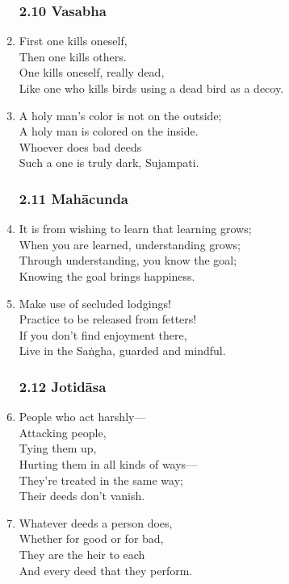 \documentclass[10pt, openany]{book}
\begin{document}
\begin{enumerate}
\subsubsection*{2.10 Vasabha}

\item First one kills oneself,\\
Then one kills others.\\
One kills oneself, really dead,\\
Like one who kills birds using a dead bird as a decoy.

\item A holy man’s color is not on the outside;\\
A holy man is colored on the inside.\\
Whoever does bad deeds\\
Such a one is truly dark, Sujampati.

\subsubsection*{2.11 Mahācunda}

\item It is from wishing to learn that learning grows;\\
When you are learned, understanding grows;\\
Through understanding, you know the goal;\\
Knowing the goal brings happiness.

\item Make use of secluded lodgings!\\
Practice to be released from fetters!\\
If you don’t find enjoyment there,\\
Live in the Saṅgha, guarded and mindful.

\subsubsection*{2.12 Jotidāsa}

\item People who act harshly—\\
Attacking people,\\
Tying them up,\\
Hurting them in all kinds of ways—\\
They’re treated in the same way;\\
Their deeds don’t vanish.

\item Whatever deeds a person does,\\
Whether for good or for bad,\\
They are the heir to each\\
And every deed that they perform.


\end{enumerate}
\end{document}
